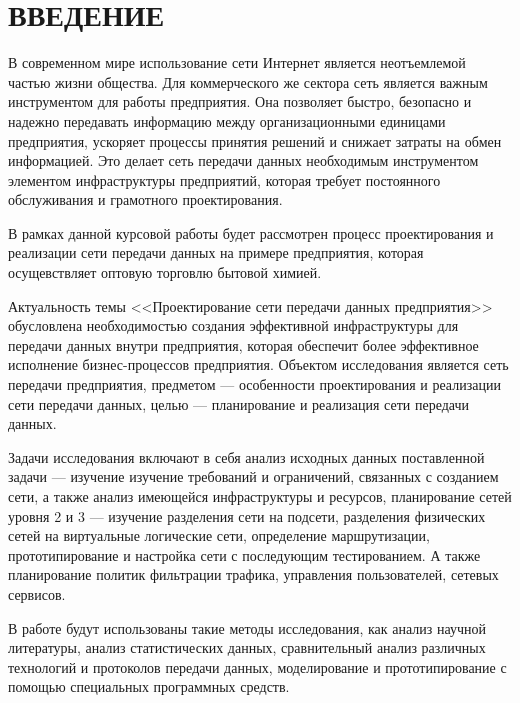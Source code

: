 \documentclass[14pt, a4paper]{extarticle}
\begin{document}
\def\contentsname{СОДЕРЖАНИЕ}

\begin{titlepage}

\end{titlepage}
\setcounter{page}{3}
\tableofcontents

\clearpage
\section*{ВВЕДЕНИЕ}

В современном мире использование сети Интернет является неотъемлемой
частью жизни общества. Для коммерческого же сектора сеть
является важным инструментом для работы предприятия. Она позволяет
быстро, безопасно и надежно передавать информацию между
организационными единицами предприятия, ускоряет процессы принятия
решений и снижает затраты на обмен информацией. Это делает сеть
передачи данных необходимым инструментом элементом инфраструктуры
предприятий, которая требует постоянного обслуживания и грамотного
проектирования.

В рамках данной курсовой работы будет рассмотрен процесс
проектирования и реализации сети передачи данных на примере
предприятия, которая осущевствляет оптовую торговлю бытовой химией.

Актуальность темы <<Проектирование сети передачи данных предприятия>>
обусловлена необходимостью создания эффективной инфраструктуры для
передачи данных внутри предприятия, которая обеспечит более
эффективное исполнение бизнес-процессов предприятия. Объектом
исследования является сеть передачи предприятия, предметом ---
особенности проектирования и реализации сети передачи данных, целью
--- планирование и реализация сети передачи данных.

Задачи исследования включают в себя анализ исходных данных
поставленной задачи --- изучение изучение требований и ограничений,
связанных с созданием сети, а также анализ имеющейся инфраструктуры и
ресурсов, планирование сетей уровня 2 и 3 --- изучение разделения сети
на подсети, разделения физических сетей на виртуальные логические
сети, определение маршрутизации, прототипирование и настройка сети с
последующим тестированием. А также планирование политик фильтрации
трафика, управления пользователей, сетевых сервисов.

В работе будут использованы такие методы исследования, как анализ
научной литературы, анализ статистических данных, сравнительный анализ
различных технологий и протоколов передачи данных, моделирование и
прототипирование с помощью специальных программных средств.
\end{document}
